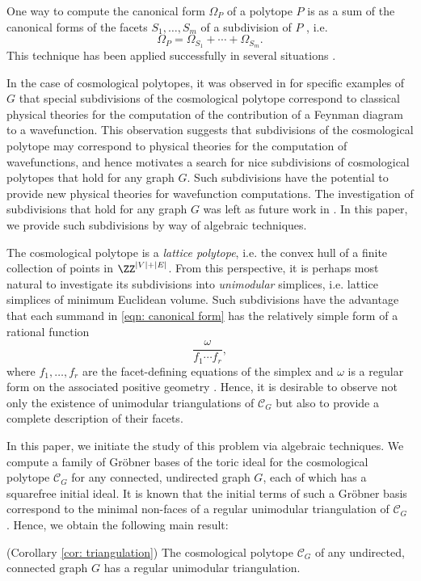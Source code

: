 One way to compute the canonical form $\Omega_P$ of a polytope $P$ is as a sum of the canonical forms of the facets $S_1,\ldots, S_m$ of a subdivision of $P$ \cite{lam2022invitation}, i.e.
\begin{equation}
    \label{eqn: canonical form}
    \Omega_P = \Omega_{S_1} + \cdots + \Omega_{S_m}. 
\end{equation}
This technique has been applied successfully in several situations \cite{benincasa2022physical,galashin2020parity,herrmann2021positive,kojima2020sign,mohammadi2021triangulations}.  

In the case of cosmological polytopes, it was observed in \cite{arkani2017cosmological} for specific examples of $G$ that special subdivisions of the cosmological polytope correspond to classical physical theories for the computation of the contribution of a Feynman diagram to a wavefunction.
This observation suggests that subdivisions of the cosmological polytope may correspond to physical theories for the computation of wavefunctions, and hence motivates a search for nice subdivisions of cosmological polytopes that hold for any graph $G$.  
Such subdivisions have the potential to provide new physical theories for wavefunction computations. 
The investigation of subdivisions that hold for any graph $G$ was left as future work in \cite{arkani2017cosmological}.
In this paper, we provide such subdivisions by way of algebraic techniques.

The cosmological polytope is a \emph{lattice polytope}, i.e. the convex hull of a finite collection of points in $\ZZ^{|V|+|E|}$. 
From this perspective, it is perhaps most natural to investigate its subdivisions into \emph{unimodular} simplices, i.e. lattice simplices of minimum Euclidean volume. 
Such subdivisions have the advantage that each summand in \eqref{eqn: canonical form} has the relatively simple form of a rational function
\begin{equation}
\label{eqn: canonical form formula}
    \frac{\omega}{f_1\cdots f_r},
\end{equation}
where $f_1,\ldots, f_r$ are the facet-defining equations of the simplex and $\omega$ is a regular form on the associated positive geometry \cite{arkani2015positive}. 
Hence, it is desirable to observe not only the existence of unimodular triangulations of $\mathcal{C}_G$ but also to provide a complete description of their facets. 

In this paper, we initiate the study of this problem via algebraic techniques. 
We compute a family of Gr\"obner bases of the toric ideal for the cosmological polytope $\mathcal{C}_G$ for any connected, undirected graph $G$, each of which has a squarefree initial ideal. 
It is known that the initial terms of such a Gr\"obner basis correspond to the minimal non-faces of a regular unimodular triangulation of $\mathcal{C}_G$ \cite{sturmfels1996grobner}. 
Hence, we obtain the following main result:
\begin{thmx} (Corollary \ref{cor: triangulation})
    \label{thm: main}
    The cosmological polytope $\mathcal{C}_G$ of any undirected, connected graph $G$ has a regular unimodular triangulation. 
\end{thmx}

